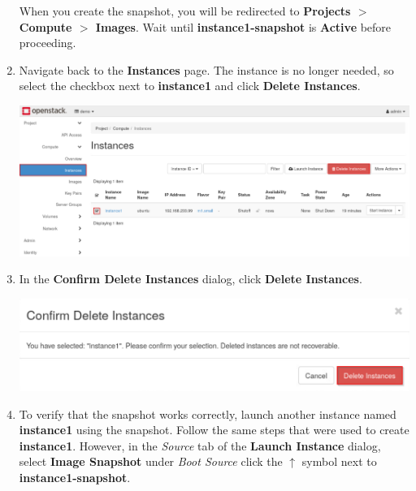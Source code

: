 \documentclass[letterpaper, 12pt]{article}
\begin{document}
\begin{enumerate}
    \begin{stopbox}
        When you create the snapshot, you will be redirected to \textbf{Projects $>$ Compute $>$ Images}.
        Wait until \textbf{instance1-snapshot} is \textbf{Active} before proceeding.
    \end{stopbox}

    \item Navigate back to the \textbf{Instances} page.
    The instance is no longer needed, so select the checkbox next to \textbf{instance1} and click \textbf{Delete Instances}.

    \begin{center}
        \includegraphics[width=\linewidth]{images/part1/step15.png}
    \end{center}

    \item In the \textbf{Confirm Delete Instances} dialog, click \textbf{Delete Instances}.

    \begin{center}
        \includegraphics[width=\linewidth]{images/part1/step16.png}
    \end{center}

    \item To verify that the snapshot works correctly, launch another instance named \textbf{instance1} using the snapshot.
    Follow the same steps that were used to create \textbf{instance1}.
    However, in the \textit{Source} tab of the \textbf{Launch Instance} dialog, select \textbf{Image Snapshot} under \textit{Boot Source} click the $\uparrow$ symbol next to \textbf{instance1-snapshot}.


\end{enumerate}
\end{document}
